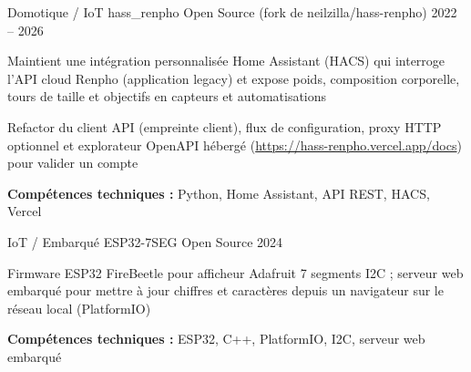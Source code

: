 \begin{cventries}
\cventry
    {Domotique / IoT} %
    {hass\_renpho} %
    {Open Source (fork de neilzilla/hass-renpho)} %
    {2022 -- 2026} %
    {
    \begin{cvitems} %
    \item {Maintient une intégration personnalisée Home Assistant (HACS) qui interroge l'API cloud Renpho (application legacy) et expose poids, composition corporelle, tours de taille et objectifs en capteurs et automatisations}
    \item {Refactor du client API (empreinte client), flux de configuration, proxy HTTP optionnel et explorateur OpenAPI hébergé (\url{https://hass-renpho.vercel.app/docs}) pour valider un compte}
    \item {\textbf{Compétences techniques :} Python, Home Assistant, API REST, HACS, Vercel}
    \end{cvitems}
    }

\cventry
    {IoT / Embarqué} %
    {ESP32-7SEG} %
    {Open Source} %
    {2024} %
    {
    \begin{cvitems} %
    \item {Firmware ESP32 FireBeetle pour afficheur Adafruit 7 segments I2C ; serveur web embarqué pour mettre à jour chiffres et caractères depuis un navigateur sur le réseau local (PlatformIO)}
    \item {\textbf{Compétences techniques :} ESP32, C++, PlatformIO, I2C, serveur web embarqué}
    \end{cvitems}
    }

\end{cventries}
